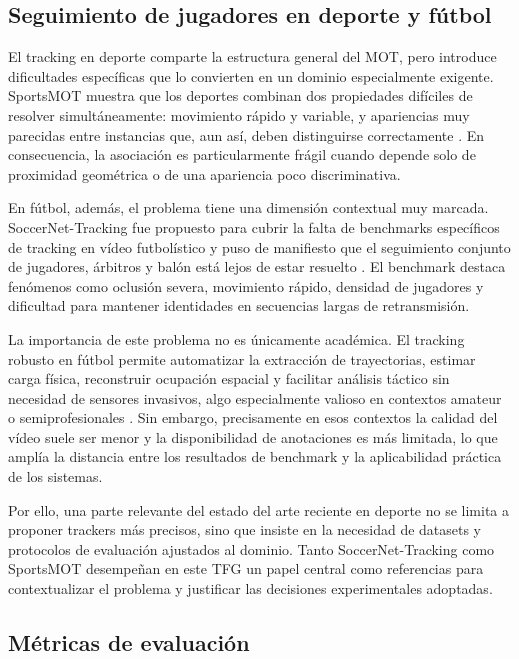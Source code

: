 \documentclass[../MAIN.tex]{subfiles}
\begin{document}
\subsection{Seguimiento de jugadores en deporte y fútbol}

El tracking en deporte comparte la estructura general del MOT, pero introduce dificultades específicas que lo convierten en un dominio especialmente exigente. SportsMOT muestra que los deportes combinan dos propiedades difíciles de resolver simultáneamente: movimiento rápido y variable, y apariencias muy parecidas entre instancias que, aun así, deben distinguirse correctamente \parencite{cui2023sportsmot}. En consecuencia, la asociación es particularmente frágil cuando depende solo de proximidad geométrica o de una apariencia poco discriminativa.

En fútbol, además, el problema tiene una dimensión contextual muy marcada. SoccerNet-Tracking fue propuesto para cubrir la falta de benchmarks específicos de tracking en vídeo futbolístico y puso de manifiesto que el seguimiento conjunto de jugadores, árbitros y balón está lejos de estar resuelto \parencite{cioppa2022soccernettracking}. El benchmark destaca fenómenos como oclusión severa, movimiento rápido, densidad de jugadores y dificultad para mantener identidades en secuencias largas de retransmisión.

La importancia de este problema no es únicamente académica. El tracking robusto en fútbol permite automatizar la extracción de trayectorias, estimar carga física, reconstruir ocupación espacial y facilitar análisis táctico sin necesidad de sensores invasivos, algo especialmente valioso en contextos amateur o semiprofesionales \parencite{cioppa2022soccernettracking,cui2023sportsmot}. Sin embargo, precisamente en esos contextos la calidad del vídeo suele ser menor y la disponibilidad de anotaciones es más limitada, lo que amplía la distancia entre los resultados de benchmark y la aplicabilidad práctica de los sistemas.

Por ello, una parte relevante del estado del arte reciente en deporte no se limita a proponer trackers más precisos, sino que insiste en la necesidad de datasets y protocolos de evaluación ajustados al dominio. Tanto SoccerNet-Tracking como SportsMOT desempeñan en este TFG un papel central como referencias para contextualizar el problema y justificar las decisiones experimentales adoptadas.

\subsection{Métricas de evaluación}
\end{document}
